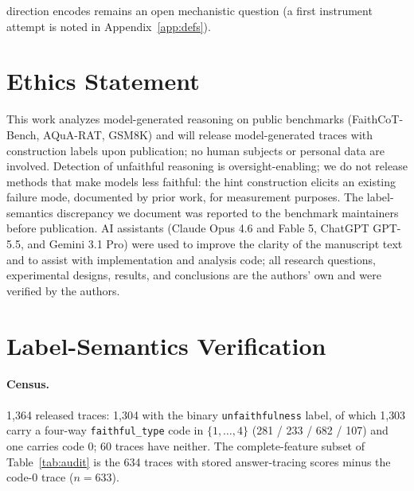 \documentclass{article}
\begin{document}
direction encodes remains an open mechanistic question (a first instrument attempt is noted in Appendix~\ref{app:defs}).

\section*{Ethics Statement}
This work analyzes model-generated reasoning on public benchmarks (FaithCoT-Bench, AQuA-RAT, GSM8K) and will release model-generated traces with construction labels upon publication; no human subjects or personal data are involved. Detection of unfaithful reasoning is oversight-enabling; we do not release methods that make models less faithful: the hint construction elicits an existing failure mode, documented by prior work, for measurement purposes. The label-semantics discrepancy we document was reported to the benchmark maintainers before publication. AI assistants (Claude Opus 4.6 and Fable 5, ChatGPT GPT-5.5, and Gemini 3.1 Pro) were used to improve the clarity of the manuscript text and to assist with implementation and analysis code; all research questions, experimental designs, results, and conclusions are the authors' own and were verified by the authors.




\appendix

\section{Label-Semantics Verification}
\label{app:labels}

\paragraph{Census.} 1{,}364 released traces: 1{,}304 with the binary \texttt{unfaithfulness} label, of which 1{,}303 carry a four-way \texttt{faithful\_type} code in $\{1,\dots,4\}$ (281 / 233 / 682 / 107) and one carries code 0; 60 traces have neither. The complete-feature subset of Table~\ref{tab:audit} is the 634 traces with stored answer-tracing scores minus the code-0 trace ($n{=}633$).
\end{document}
